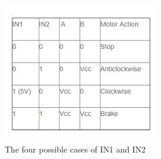   \begin{figure}[H]%
    \center%
    \includegraphics[width=.8\textwidth]{images/Alzahraa/possible_cases.JPG}%
    \caption[Possible Cases of Motor Driver Pins]{The four possible cases of IN1 and IN2 \cite{web003}}\label{fig:possible cases}%
  \end{figure} 
